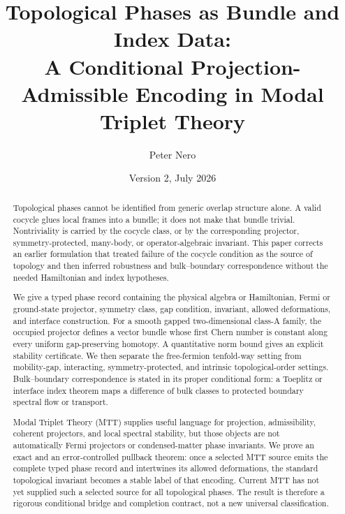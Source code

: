 \documentclass[11pt]{article}
\title{\textbf{Topological Phases as Bundle and Index Data:}\\
\large A Conditional Projection-Admissible Encoding in Modal Triplet Theory}
\author{Peter Nero}
\date{Version 2, July 2026}
\theoremstyle{definition}
\theoremstyle{remark}
\begin{document}
\maketitle

\begin{abstract}
Topological phases cannot be identified from generic overlap structure
alone.  A valid cocycle glues local frames into a bundle; it does not make
that bundle trivial.  Nontriviality is carried by the cocycle class, or by
the corresponding projector, symmetry-protected, many-body, or
operator-algebraic invariant.  This paper corrects an earlier formulation
that treated failure of the cocycle condition as the source of topology and
then inferred robustness and bulk--boundary correspondence without the
needed Hamiltonian and index hypotheses.

We give a typed phase record containing the physical algebra or Hamiltonian,
Fermi or ground-state projector, symmetry class, gap condition, invariant,
allowed deformations, and interface construction.  For a smooth gapped
two-dimensional class-A family, the occupied projector defines a vector
bundle whose first Chern number is constant along every uniform
gap-preserving homotopy.  A quantitative norm bound gives an explicit
stability certificate.  We then separate the free-fermion tenfold-way
setting from mobility-gap, interacting, symmetry-protected, and intrinsic
topological-order settings.  Bulk--boundary correspondence is stated in its
proper conditional form: a Toeplitz or interface index theorem maps a
difference of bulk classes to protected boundary spectral flow or transport.

Modal Triplet Theory (MTT) supplies useful language for projection,
admissibility, coherent projectors, and local spectral stability, but those
objects are not automatically Fermi projectors or condensed-matter phase
invariants.  We prove an exact and an error-controlled pullback theorem:
once a selected MTT source emits the complete typed phase record and
intertwines its allowed deformations, the standard topological invariant
becomes a stable label of that encoding.  Current MTT has not yet supplied
such a selected source for all topological phases.  The result is therefore
a rigorous conditional bridge and completion contract, not a new universal
classification.
\end{abstract}
\end{document}
